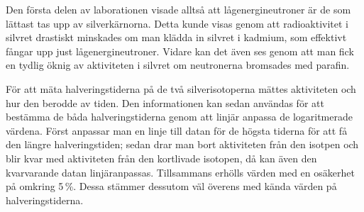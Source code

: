 \documentclass[11pt,a4paper, english, swedish
]{article}
\begin{document}
Den första delen av laborationen visade alltså att lågenergineutroner är de som lättast tas upp av silverkärnorna. Detta kunde visas genom att radioaktivitet i silvret drastiskt minskades om man klädda in silvret i kadmium, som effektivt fångar upp just lågenergineutroner. Vidare kan det även ses genom att man fick en tydlig öknig av aktiviteten i silvret om neutronerna bromsades med parafin. 

För att mäta halveringstiderna på de två silverisotoperna mättes aktiviteten och hur den berodde av tiden. Den informationen kan sedan användas för att bestämma de båda halveringstiderna genom att linjär anpassa de logaritmerade värdena. Först anpassar man en linje till datan för de högsta tiderna för att få den längre halveringstiden; sedan drar man bort aktiviteten från den isotpen och blir kvar med aktiviteten från den kortlivade isotopen, då kan även den kvarvarande datan linjäranpassas. Tillsammans erhölls värden med en osäkerhet på omkring 5\,\%. Dessa stämmer dessutom väl överens med kända värden på halveringstiderna. 


 
\end{document}
